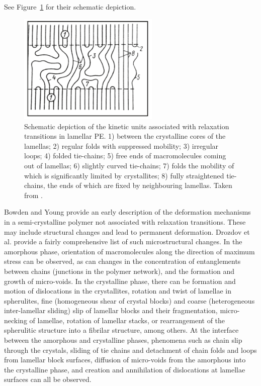 See Figure~\ref{fig:kinetic_units_relax_scp} for their schematic depiction.
\begin{figure}[hbtp]
	\centering
	\includegraphics[width=0.6\textwidth]{figures/kinetic_units_scp}
	\caption{Schematic depiction of the kinetic units associated with relaxation transitions in lamellar PE. 1) between the crystalline cores of the lamellas; 2) regular folds with suppressed mobility; 3) irregular loops; 4) folded tie-chains; 5) free ends of macromolecules coming out of lamellas; 6) slightly curved tie-chains; 7) folds the mobility of which is significantly limited by crystallites; 8) fully straightened tie-chains, the ends of which are fixed by neighbouring lamellas. Taken from \cite{arzhakovRelaxationPhysicalMechanical2019}.}
\label{fig:kinetic_units_relax_scp}
\end{figure}

Bowden and Young \citep{bowdenDeformationMechanismsCrystalline1974} provide an early description of the deformation mechanisms in a semi-crystalline polymer not associated with relaxation transitions.
These may include structural changes and lead to permanent deformation.
Drozdov et al. \citep{drozdovViscoelasticityViscoplasticityCreep2009} provide a fairly comprehensive list of such microstructural changes.
In the amorphous phase, orientation of macromolecules along the direction of maximum stress can be observed, as can changes in the concentration of entanglements between chains (junctions in the polymer network), and the formation and growth of micro-voids.
In the crystalline phase, there can be formation and motion of dislocations in the crystallites, rotation and twist of lamellae in spherulites, fine (homogeneous shear of crystal blocks) and coarse (heterogeneous inter-lamellar sliding) slip of lamellar blocks and their fragmentation, micro-necking of lamellae, rotation of lamellar stacks, or rearrangement of the spherulitic structure into a fibrilar structure, among others.
At the interface between the amorphous and crystalline phases, phenomena such as chain slip through the crystals, sliding of tie chains and detachment of chain folds and loops from lamellar block surfaces, diffusion of micro-voids from the amorphous into the crystalline phase, and creation and annihilation of dislocations at lamellae surfaces can all be observed.


